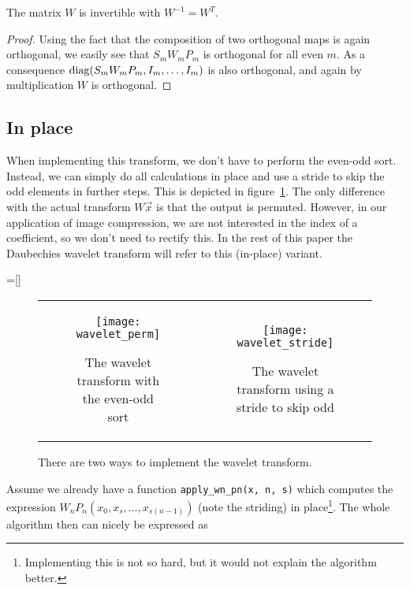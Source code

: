 \begin{theorem}
	The matrix $W$ is invertible with $W^{-1} = W^T$.
\end{theorem}
\begin{proof}
	Using the fact that the composition of two orthogonal maps is again orthogonal, we easily see that $S_m W_m P_m$ is orthogonal for all even $m$. As a consequence $\operatorname{diag}(S_m W_m P_m, I_m, \ldots, I_m)$ is also orthogonal, and again by multiplication $W$ is orthogonal.
\end{proof}


\subsection{In place}
When implementing this transform, we don't have to perform the even-odd sort. Instead, we can simply do all calculations in place and use a stride to skip the odd elements in further steps. This is depicted in figure~\ref{fig:wavelet_stride}. The only difference with the actual transform $W \vec{x}$ is that the output is permuted. However, in our application of image compression, we are not interested in the index of a coefficient, so we don't need to rectify this. In the rest of this paper the Daubechies wavelet transform will refer to this (in-place) variant.

=[]
\begin{figure}
	\begin{tabular}{c|c}
	\begin{subfigure}[b]{0.5\textwidth}
		\centering
		\texttt{[image: wavelet\_perm]}
		\caption{The wavelet transform with the even-odd sort}
	\end{subfigure}&
	\begin{subfigure}[b]{0.5\textwidth}
		\centering
		\texttt{[image: wavelet\_stride]}
		\caption{The wavelet transform using a stride to skip odd}
	\end{subfigure}
	\end{tabular}
	\caption{There are two ways to implement the wavelet transform.}
	\label{fig:wavelet_stride}
\end{figure}

Assume we already have a function \texttt{apply\_wn\_pn(x, n, s)} which computes the expression $W_n P_n (x_0, x_s, \ldots, x_{s(n-1)})$ (note the striding) in place\footnote{Implementing this is not so hard, but it would not explain the algorithm better.}. The whole algorithm then can nicely be expressed as

